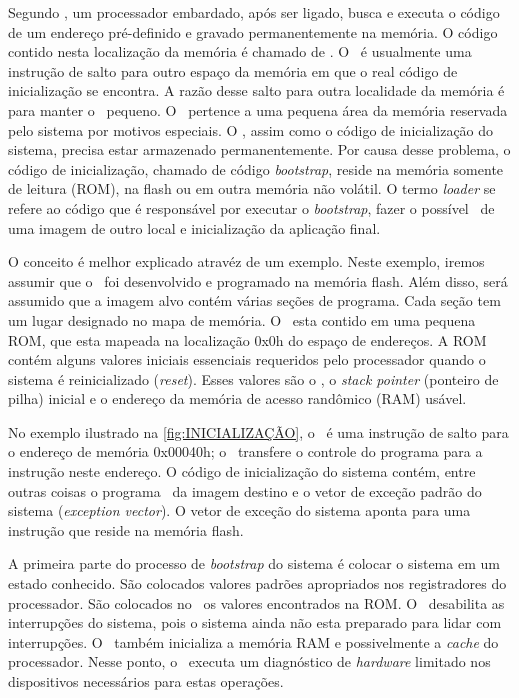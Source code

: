 Segundo , um processador embardado, após ser ligado, busca e executa o código de um endereço pré-definido e gravado permanentemente na memória. O código contido nesta localização da memória é chamado de \resetv. O \resetv\ é usualmente uma instrução de salto para outro espaço da memória em que o real código de inicialização se encontra. A razão desse salto para outra localidade da memória é para manter o \resetv\ pequeno. O \resetv\ pertence a uma pequena área da memória reservada pelo sistema por motivos especiais. O \resetv, assim como o código de inicialização do sistema, precisa estar armazenado permanentemente. Por causa desse problema, o código de inicialização, chamado de código \textit{bootstrap}, reside na memória somente de leitura (ROM), na flash ou em outra memória não volátil. O termo \textit{loader} se refere ao código que é responsável por executar o \textit{bootstrap}, fazer o possível \download\ de uma imagem de outro local e inicialização da aplicação final.

O conceito é melhor explicado atravéz de um exemplo. Neste exemplo, iremos assumir que o \loader\ foi desenvolvido e programado na memória flash. Além disso, será assumido que a imagem alvo contém várias seções de programa. Cada seção tem um lugar designado no mapa de memória. O \resetv\ esta contido em uma pequena ROM, que esta mapeada na localização 0x0h do espaço de endereços. A ROM contém alguns valores iniciais essenciais requeridos pelo processador quando o sistema é reinicializado (\textit{reset}). Esses valores são o \resetv, o \textit{stack pointer} (ponteiro de pilha) inicial e o endereço da memória de acesso randômico (RAM) usável. 

No exemplo ilustrado na \autoref{fig:INICIALIZAÇÃO}, o \resetv\ é uma instrução de salto para o endereço de memória 0x00040h; o \resetv\ transfere o controle do programa para a instrução neste endereço. O código de inicialização do sistema contém, entre outras coisas o programa \loader\ da imagem destino e o vetor de exceção padrão do sistema (\textit{exception vector}). O vetor de exceção do sistema aponta para uma instrução que reside na memória flash.

A primeira parte do processo de \textit{bootstrap} do sistema é colocar o sistema em um estado conhecido. São colocados valores padrões apropriados nos registradores do processador. São colocados no \stackp\ os valores encontrados na ROM. O \loader\ desabilita as interrupções do sistema, pois o sistema ainda não esta preparado para lidar com interrupções. O \loader\ também inicializa a memória RAM e possivelmente a \textit{cache} do processador. Nesse ponto, o \loader\ executa um diagnóstico de \textit{hardware} limitado nos dispositivos necessários para estas operações.

